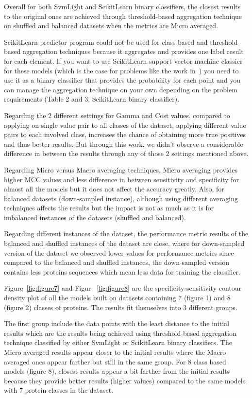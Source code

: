 Overall for both SvmLight and ScikitLearn binary classifiers, the closest results to the original ones are achieved through 
threshold-based aggregation technique on shuffled and balanced datasets when the metrics are Micro averaged.

ScikitLearn predictor program could not be used for class-based and threshold-based aggregation techniques because 
it aggregates and provides one label result for each element. If you want to use ScikitLearn support vector machine 
classier for these models (which is the case for problems like the work in~\cite{mishra2014prediction}) 
you need to use it as a binary classifier that provides the probability for each point and you can manage the 
aggregation technique on your own depending on the problem requirements (Table 2 and 3, ScikitLearn binary classifier).

Regarding the 2 different settings for Gamma and Cost values, compared to applying on single value pair to all classes 
of the dataset, applying different value pairs to each involved class, increases the chance of obtaining more true 
positives and thus better results. But through this work, we didn’t observe a considerable difference in between the 
results through any of those 2 settings mentioned above.

Regarding Micro versus Macro averaging techniques, Micro averaging provides higher MCC values and less difference in between 
sensitivity and specificity for almost all the models but it does not affect the accuracy greatly. Also, for balanced 
datasets (down-sampled instance), although using different averaging techniques affects the results but the impact 
is not as much as it is for imbalanced instances of the datasets (shuffled and balanced).

Regarding different instances of the dataset, the performance metric results of the balanced and shuffled 
instances of the dataset are close, where for down-sampled version of the dataset we observed lower 
values for performance metrics since compared to the balanced and shuffled instances, the down-sampled version 
contains less proteins sequences which mean less data for training the classifier.


Figure~\ref{fig:figure7} and Figur ~\ref{fig:figure8} are the specificity-sensitivity contour density plot of all 
the models built on datasets containing 7 (figure 1) and 8 (figure 2) classes of proteins. The results fit themselves 
into 3 different groups. 

The first group include the data points with the least distance to the initial results which are the results being 
achieved using threshold-based aggregation technique classified by either SvmLight or ScikitLearn binary classifiers. 
The Micro averaged results appear closer to the initial results where the Macro averaged ones appear farther but 
still in the same group. For 8 class based models (figure 8), closest results appear a bit farther from the initial 
results because they provide better results (higher values) compared to the same models with 7 protein classes 
in the dataset.

